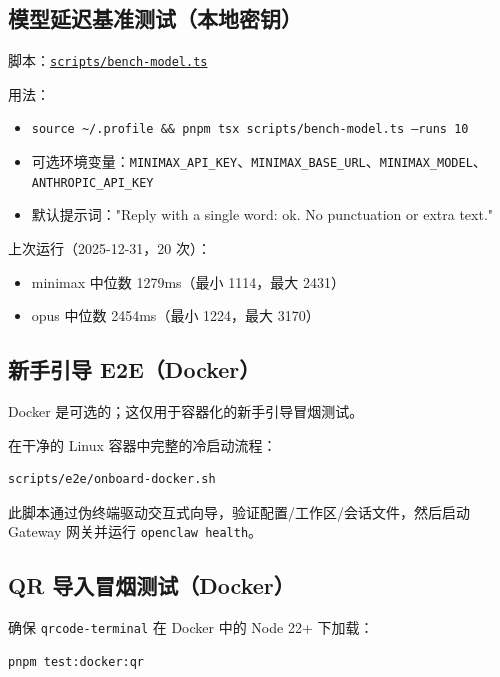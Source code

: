 \subsection{模型延迟基准测试（本地密钥）}


脚本：\href{https://github.com/openclaw/openclaw/blob/main/scripts/bench-model.ts}{\texttt{scripts/bench-model.ts}}

用法：

\begin{itemize}
  \item \texttt{source \textasciitilde{}/.profile \&\& pnpm tsx scripts/bench-model.ts --runs 10}
  \item 可选环境变量：\texttt{MINIMAX\_API\_KEY}、\texttt{MINIMAX\_BASE\_URL}、\texttt{MINIMAX\_MODEL}、\texttt{ANTHROPIC\_API\_KEY}
  \item 默认提示词："Reply with a single word: ok. No punctuation or extra text."
\end{itemize}


上次运行（2025-12-31，20 次）：

\begin{itemize}
  \item minimax 中位数 1279ms（最小 1114，最大 2431）
  \item opus 中位数 2454ms（最小 1224，最大 3170）
\end{itemize}


\subsection{新手引导 E2E（Docker）}


Docker 是可选的；这仅用于容器化的新手引导冒烟测试。

在干净的 Linux 容器中完整的冷启动流程：

\begin{lstlisting}[language=bash]
scripts/e2e/onboard-docker.sh
\end{lstlisting}


此脚本通过伪终端驱动交互式向导，验证配置/工作区/会话文件，然后启动 Gateway 网关并运行 \texttt{openclaw health}。

\subsection{QR 导入冒烟测试（Docker）}


确保 \texttt{qrcode-terminal} 在 Docker 中的 Node 22+ 下加载：

\begin{lstlisting}[language=bash]
pnpm test:docker:qr
\end{lstlisting}



